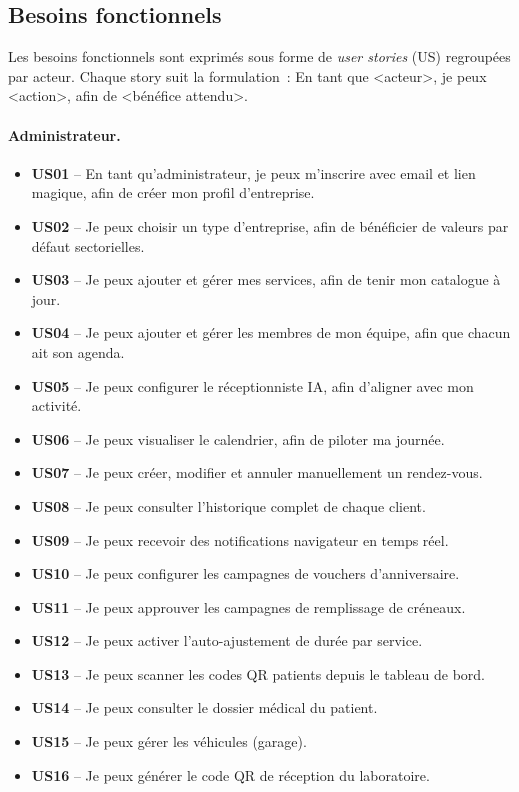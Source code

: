 \subsection{Besoins fonctionnels}
Les besoins fonctionnels sont exprimés sous forme de \emph{user
stories} (US) regroupées par acteur. Chaque story suit la
formulation~: \og En tant que <acteur>, je peux <action>, afin de
<bénéfice attendu>. \fg{}

\paragraph{Administrateur.}
\begin{itemize}[leftmargin=1.5em,itemsep=2pt,topsep=2pt]
  \item \textbf{US01} -- En tant qu'administrateur, je peux m'inscrire avec email et lien magique, afin de créer mon profil d'entreprise.
  \item \textbf{US02} -- Je peux choisir un type d'entreprise, afin de bénéficier de valeurs par défaut sectorielles.
  \item \textbf{US03} -- Je peux ajouter et gérer mes services, afin de tenir mon catalogue à jour.
  \item \textbf{US04} -- Je peux ajouter et gérer les membres de mon équipe, afin que chacun ait son agenda.
  \item \textbf{US05} -- Je peux configurer le réceptionniste IA, afin d'aligner \nova{} avec mon activité.
  \item \textbf{US06} -- Je peux visualiser le calendrier, afin de piloter ma journée.
  \item \textbf{US07} -- Je peux créer, modifier et annuler manuellement un rendez-vous.
  \item \textbf{US08} -- Je peux consulter l'historique complet de chaque client.
  \item \textbf{US09} -- Je peux recevoir des notifications navigateur en temps réel.
  \item \textbf{US10} -- Je peux configurer les campagnes de vouchers d'anniversaire.
  \item \textbf{US11} -- Je peux approuver les campagnes de remplissage de créneaux.
  \item \textbf{US12} -- Je peux activer l'auto-ajustement de durée par service.
  \item \textbf{US13} -- Je peux scanner les codes QR patients depuis le tableau de bord.
  \item \textbf{US14} -- Je peux consulter le dossier médical du patient.
  \item \textbf{US15} -- Je peux gérer les véhicules (garage).
  \item \textbf{US16} -- Je peux générer le code QR de réception du laboratoire.
\end{itemize}

